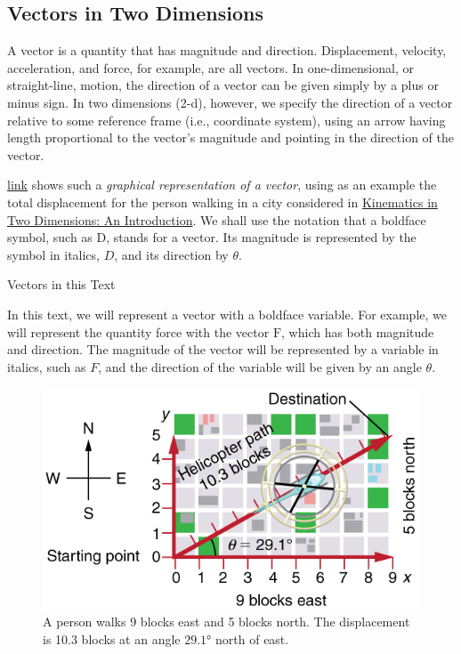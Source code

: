 \documentclass[
]{book}
\begin{document}
\hypertarget{fs-id1165296240221}{}
\hypertarget{vectors-in-two-dimensions}{%
\subsection{Vectors in Two Dimensions}\label{vectors-in-two-dimensions}}

A \protect\hypertarget{import-auto-id1165296389850}{}{vector} is a quantity
that has magnitude and direction. Displacement, velocity, acceleration,
and force, for example, are all vectors. In one-dimensional, or
straight-line, motion, the direction of a vector can be given simply by
a plus or minus sign. In two dimensions (2-d), however, we specify the
direction of a vector relative to some reference frame (i.e., coordinate
system), using an arrow having length proportional to the vector's
magnitude and pointing in the direction of the vector.

\protect\hyperlink{import-auto-id1165298666909}{link} shows such
a \emph{graphical representation of a vector}, using as an example the total
displacement for the person walking in a city considered in \href{/m54779}{Kinematics
in Two Dimensions: An Introduction}. We shall use the notation
that a boldface symbol, such as \(\text{D}{}\), stands for a vector. Its
magnitude is represented by the symbol in italics, \(D{}\), and its
direction by \(\theta{}\).

\hypertarget{fs-id1165296218458}{}
Vectors in this Text

In this text, we will represent a vector with a boldface variable. For
example, we will represent the quantity force with the vector
\(\text{F}{}\), which has both magnitude and direction. The magnitude of
the vector will be represented by a variable in italics, such as \(F{}\),
and the direction of the variable will be given by an angle \(\theta{}\).

\begin{figure}
\hypertarget{import-auto-id1165298666909}{%
\centering
\includegraphics{images/Figure_03_02_01.jpg}
\caption{A person walks 9 blocks east and 5 blocks north. The displacement is
10.3 blocks at an angle \({\text{29}\text{.1°}}{}\) north of
east.}\label{import-auto-id1165298666909}
}
\end{figure}
\end{document}

